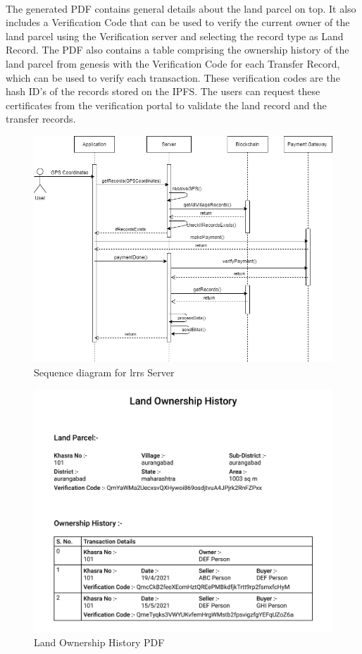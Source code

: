 \documentclass{article}
\begin{document}
        \paragraph{}
        The generated PDF contains general details about the land parcel on top. It also includes a Verification Code that can be used to verify the current owner of the land parcel using the Verification server and selecting the record type as Land Record. The PDF also contains a table comprising the ownership history of the land parcel from genesis with the Verification Code for each Transfer Record, which can be used to verify each transaction. These verification codes are the hash ID's of the records stored on the IPFS. The users can request these certificates from the verification portal to validate the land record and the transfer records.
        \begin{figure}[H]
                \includegraphics[scale=0.5]{lrsp_seq.png}
                \centering
                \caption{Sequence diagram for \gls{lrrs} Server}
        \end{figure}
        \begin{figure}[H]
                \includegraphics[scale=0.25]{landRecord.png}
                \centering
                \caption{Land Ownership History PDF}
                \label{fig:pdfreport}
        \end{figure}
\end{document}
